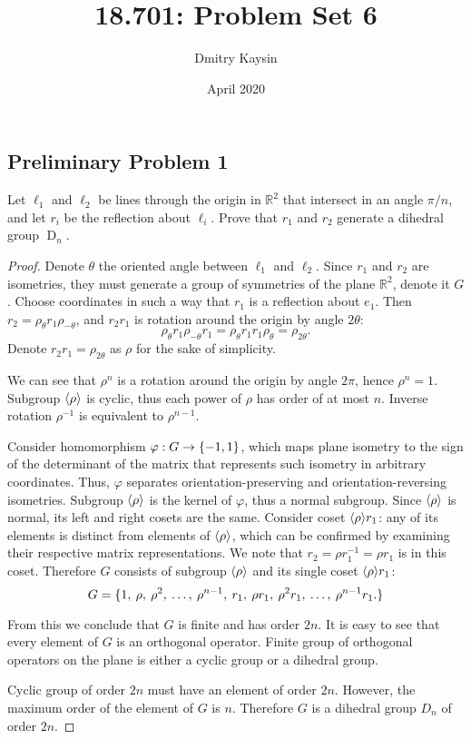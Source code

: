 \documentclass{article}
\title{18.701: Problem Set 6}
\author{Dmitry Kaysin}
\date{April 2020}
\theoremstyle{definition}
\newcommand{\R}{\mathbb{R}}
\newcommand{\D}{\operatorname{D}}
\DeclarePairedDelimiter\set{\{}{\}}
\DeclarePairedDelimiter\genby{\langle}{\rangle}
\begin{document}
\maketitle 


\subsection*{Preliminary Problem 1}

\begin{tcolorbox}
Let $\ell_1$ and $\ell_2$ be lines through the origin in $\R^2$ that intersect in an angle $\pi / n$, and let $r_i$ be the reflection about $\ell_i$.
Prove that $r_1$ and $r_2$ generate a dihedral group $\D_n$.
\end{tcolorbox}

\begin{proof}

Denote $\theta$ the oriented angle between $\ell_1$ and $\ell_2$.
Since $r_1$ and $r_2$ are isometries, they must generate a group of symmetries of the plane $\R^2$, denote it $G$.
Choose coordinates in such a way that $r_1$ is a reflection about $e_1$.
Then $r_2 = \rho_\theta r_1 \rho_{-\theta}$, and $r_2 r_1$ is rotation around the origin by angle $2\theta$:
\[
    \rho_\theta r_1 \rho_{-\theta} r_1
    = \rho_\theta r_1 r_1 \rho_{\theta}
    = \rho_{2\theta}.
\]
Denote $r_2 r_1 = \rho_{2\theta}$ as $\rho$ for the sake of simplicity.

We can see that $\rho^n$ is a rotation around the origin by angle $2\pi$, hence $\rho^n = 1$.
Subgroup $\genby{\rho}$ is cyclic, thus each power of $\rho$ has order of at most $n$.
Inverse rotation $\rho^{-1}$ is equivalent to $\rho^{n-1}$.

Consider homomorphism $\varphi : G \to \set{-1,1}$, which maps plane isometry to the sign of the determinant of the matrix that represents such isometry in arbitrary coordinates.
Thus, $\varphi$ separates orientation-preserving and orientation-reversing isometries.
Subgroup $\genby{\rho}$ is the kernel of $\varphi$, thus a normal subgroup.
Since $\genby{\rho}$ is normal, its left and right cosets are the same. 
Consider coset $\genby{\rho} r_1$:
any of its elements is distinct from elements of $\genby{\rho}$, which can be confirmed by examining their respective matrix representations.
We note that $r_2 = \rho r_1^{-1} = \rho r_1$ is in this coset.
Therefore $G$ consists of subgroup $\genby{\rho}$ and its single coset $\genby{\rho} r_1$:
\[
    G = \set{
        1, \> \rho, \> \rho^2, \> \dots, \> \rho^{n-1}, \>
        r_1, \> \rho r_1, \> \rho^2 r_1, \> \dots, \> \rho^{n-1} r_1.
    }
\]

From this we conclude that $G$ is finite and has order $2n$.
It is easy to see that every element of $G$ is an orthogonal operator.
Finite group of orthogonal operators on the plane is either a cyclic group or a dihedral group.

Cyclic group of order $2n$ must have an element of order $2n$.
However, the maximum order of the element of $G$ is $n$.
Therefore $G$ is a dihedral group $D_n$ of order $2n$.

\end{proof}
\end{document}
